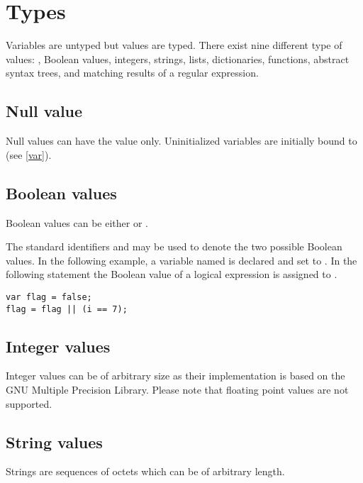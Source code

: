 \chapter{Types}

Variables are untyped but values are typed. There exist nine different
type of values: , Boolean values, integers, strings,
lists, dictionaries, functions, abstract syntax trees, and matching
results of a regular expression.

\section{Null value}\label{null}

Null values can have the value  only.
Uninitialized variables are initially bound to 
(see \ref{var}).

\section{Boolean values}

Boolean values can be either  or .

The standard identifiers  and 
may be used to denote the two possible Boolean values. In
the following example, a variable named  is
declared and set to . In the following statement
the Boolean value of a logical expression is assigned to .

\begin{lstlisting}
var flag = false;
flag = flag || (i == 7);
\end{lstlisting}

\section{Integer values}\label{integer}

Integer values can be of arbitrary size as their implementation is based
on the GNU Multiple Precision Library. Please note that floating point
values are not supported.

\section{String values}\label{string}

Strings are sequences of octets which can be of arbitrary length.

